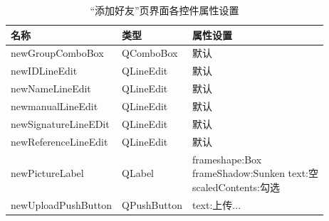 \documentclass{progartcn}
\begin{document}
\begin{table}[H]
	\renewcommand{\arraystretch}{1.0}
	\centering
	\caption{\centering “添加好友”页界面各控件属性设置}
	\begin{tabular}{lll}
		\toprule[1.5pt]
	名称                   & 类型          & 属性设置                                                                                                                                                                  \\
		\midrule[1pt]
		newGroupComboBox     & QComboBox   & 默认                                                                                                                                                                    \\
		newIDLineEdit        & QLineEdit   & 默认                                                                                                                                                                    \\
		newNameLineEdit      & QLineEdit   & 默认                                                                                                                                                                    \\
		newmanualLineEdit    & QLineEdit   & 默认                                                                                                                                                                    \\
		newSignatureLineEDit & QLineEdit   & 默认                                                                                                                                                                    \\
		newReferenceLineEdit & QLineEdit   & 默认                                                                                                                                                                    \\
		newPictureLabel      & QLabel      & \makecell[l]{frameshape:Box\\ frameShadow:Sunken text:空\\  scaledContents:勾选}                                                                                                           \\
		newUploadPushButton  & QPushButton & text:上传...                                                                                                                                                            \\

\end{tabular}
\end{table}
\end{document}
